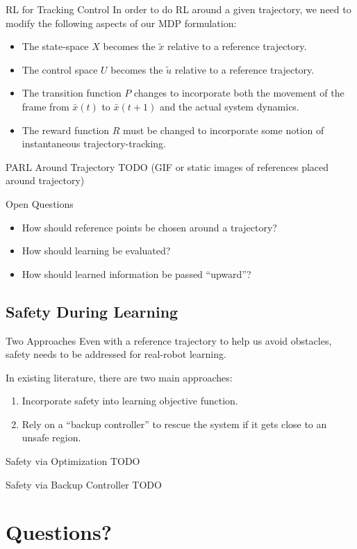 \documentclass{beamer}
\begin{document}
\begin{frame}{RL for Tracking Control}
  In order to do RL around a given trajectory, we need to modify the following
  aspects of our MDP formulation:
  \begin{itemize}
    \item The state-space $X$ becomes the $\tilde{x}$ relative to a reference trajectory.
    \item The control space $U$ becomes the $\tilde{u}$ relative to a reference trajectory.
    \item The transition function $P$ changes to incorporate both the movement
      of the frame from $\bar{x}(t)$ to $\bar{x}(t+1)$ and the actual system
      dynamics.
    \item The reward function $R$ must be changed to incorporate some notion of
      instantaneous trajectory-tracking.
  \end{itemize}

\end{frame}

\begin{frame}{PARL Around Trajectory}
  TODO (GIF or static images of references placed around trajectory)
\end{frame}

\begin{frame}{Open Questions}
  \begin{itemize}
      \item How should reference points be chosen around a trajectory?
      \item How should learning be evaluated?
      \item How should learned information be passed ``upward''?
  \end{itemize}
\end{frame}

\subsection{Safety During Learning}

\begin{frame}{Two Approaches}
  Even with a reference trajectory to help us avoid obstacles, safety needs to
  be addressed for real-robot learning.
  
  In existing literature, there are two main approaches:
  \begin{enumerate}
      \item Incorporate safety into learning objective function.
      \item Rely on a ``backup controller'' to rescue the system if it gets
        close to an unsafe region.
  \end{enumerate}
\end{frame}

\begin{frame}{Safety via Optimization}
  TODO
\end{frame}

\begin{frame}{Safety via Backup Controller}
  TODO
\end{frame}

\section{Questions?}
\end{document}
